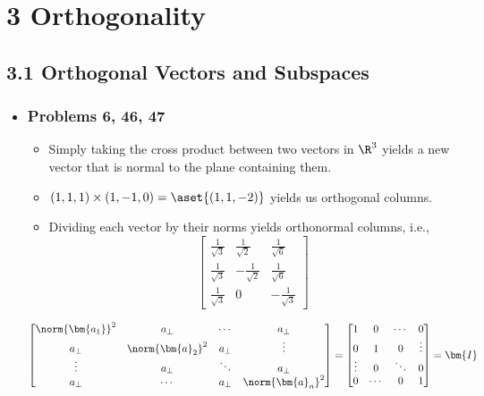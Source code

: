 \chapter{3 Orthogonality}

\section{3.1 Orthogonal Vectors and Subspaces}
\begin{itemize}
  \item []
  \subsection{Problems 6, 46, 47}
  \begin{enumerate}
      \begin{itemize}
        \item Simply taking the cross product between two vectors in \(\R^3\)
          yields a new vector that is normal to the plane containing them.
        \item \((1,1,1) \times (1,-1,0) = \aset{(1,1,-2)}\) yields us
          orthogonal columns.
        \item Dividing each vector by their norms yields orthonormal columns, i.e.,
          \[%
          \begin{bmatrix}
            \frac{1}{\sqrt{3} } & \frac{1}{\sqrt{2} } & \frac{1}{\sqrt{6} } \\
            \frac{1}{\sqrt{3} } & -\frac{1}{\sqrt{2} } & \frac{1}{\sqrt{6} } \\
            \frac{1}{\sqrt{3} } & 0 & -\frac{1}{\sqrt{3} }
          \end{bmatrix}
          \]%
      \end{itemize}

    \[%
    \begin{bmatrix}
      \norm{\bm{a_1}}^2 & a_\perp & \cdots & a_\perp \\
      a_\perp & \norm{\bm{a}_2}^2 & a_\perp & \vdots \\
      \vdots & a_\perp & \ddots & a_\perp  \\
      a_\perp & \cdots & a_\perp &\norm{\bm{a}_n}^2
    \end{bmatrix} =
    \begin{bmatrix}
      1 & 0 & \cdots & 0 \\
      0 & 1 & 0 & \vdots \\
      \vdots & 0 & \ddots & 0  \\
      0 & \cdots & 0 & 1
    \end{bmatrix} = \bm{I}
    \]%


\end{enumerate}
\end{itemize}
